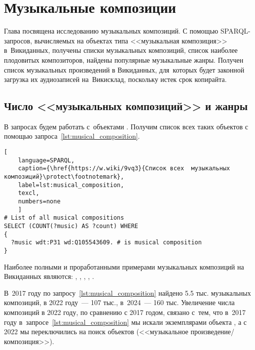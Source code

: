 \chapter{Музыкальные композиции}
\label{ch:musical-composition}
Глава посвящена исследованию музыкальных композиций. 
С помощью SPARQL-запросов, вычисляемых на объектах типа <<музыкальная композиция>> в~Викиданных, 
получены списки музыкальных композиций, список наиболее плодовитых композиторов, 
найдены популярные музыкальные жанры. 
Получен список музыкальных произведений в Викиданных, 
для~которых будет законной загрузка их аудиозаписей на~Викисклад, поскольку истек срок копирайта.

\section{Число <<музыкальных композиций>> и жанры}

В запросах будем работать с~объектами . 
Получим список всех таких объектов с помощью запроса~\ref{lst:musical_composition}.

\begin{lstlisting}[ 
    language=SPARQL,
    caption={\href{https://w.wiki/9vq3}{Список всех  музыкальных композиций}\protect\footnotemark},
    label=lst:musical_composition,
    texcl,
    numbers=none
    ]
# List of all musical compositions
SELECT (COUNT(?music) AS ?count) WHERE
{
  ?music wdt:P31 wd:Q105543609. # is musical composition
}
\end{lstlisting}%

Наиболее полными и проработанными примерами музыкальных композиций на Викиданных являются: 
, 
, 
, 
, 
.

В~2017 году по запросу~\ref{lst:musical_composition} найдено \num{5,5} тыс. музыкальных композиций, 
в 2022 году~--- 107 тыс., в~2024~--- 160 тыс. 
Увеличение числа композиций в 2022 году, по сравнению с 2017 годом, связано с~тем, 
что в~2017 году в~запросе~\ref{lst:musical_composition} мы искали экземплярами 
объекта , а с 2022 мы 
переключились на поиск объектов  
(<<музыкальное произведение/композиция>>). 

